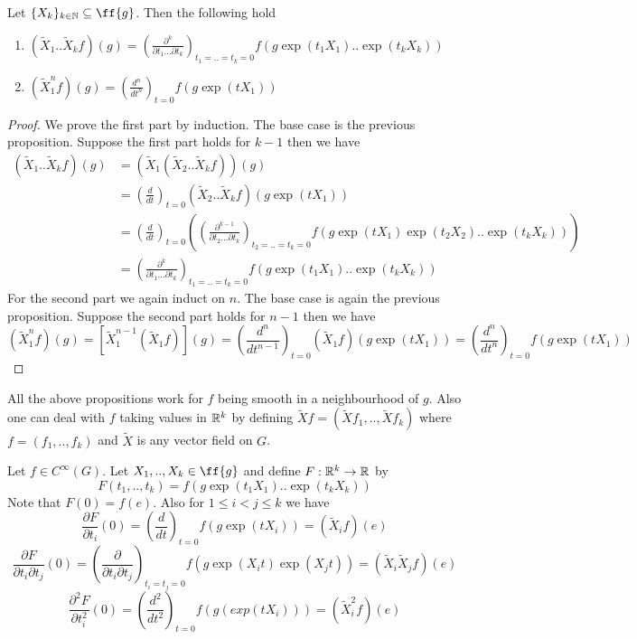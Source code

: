 \documentclass{article}
\begin{document}
\begin{proposition}
    Let $\{X_k\}_{k\in \NN}\subseteq \ff{g}$. Then the following hold
    \begin{enumerate}
        \item $(\tilde{X}_1..\tilde{X}_kf)(g) = \left(\frac{\partial^k}{\partial t_1...\partial t_k}\right)_{t_1=..=t_k=0}f(g\exp(t_1X_1)..\exp(t_kX_k))$
        \item $(\tilde{X}^n_1f)(g) = \left(\frac{d^n}{dt^n}\right)_{t=0}f(g\exp(tX_1))$
    \end{enumerate}
\end{proposition}
\begin{proof}
    We prove the first part by induction. The base case is the previous proposition. Suppose the first part holds for $k-1$ then we have 
    \begin{align*}
        (\tilde{X}_1..\tilde{X}_kf)(g) &= (\tilde{X}_1(\tilde{X}_2..\tilde{X}_kf))(g)\\
        &= \left( \frac{d}{dt} \right)_{t=0}(\tilde{X}_2..\tilde{X}_kf)(g\exp(tX_1))\\
        &= \left( \frac{d}{dt} \right)_{t=0}\left( \left( \frac{\partial^{k-1}}{\partial t_2...\partial t_k} \right)_{t_2=..=t_k=0}f(g\exp(tX_1)\exp(t_2X_2)..\exp(t_kX_k)) \right)\\
        &= \left( \frac{\partial^k}{\partial t_1...\partial t_k} \right)_{t_1=..=t_k=0}f(g\exp(t_1X_1)..\exp(t_kX_k))
    \end{align*}
    For the second part we again induct on $n$. The base case is again the previous proposition. Suppose the second part holds for $n-1$ then we have
    $$(\tilde{X}^n_1f)(g) = [\tilde{X}_1^{n-1}(\tilde{X}_1f)](g) = \left(\frac{d^n}{dt^{n-1}}\right)_{t=0}(\tilde{X}_1f)(g\exp(tX_1)) = \left(\frac{d^n}{dt^n}\right)_{t=0}f(g\exp(tX_1))$$
\end{proof}

\begin{remark*}
    All the above propositions work for $f$ being smooth in a neighbourhood of $g$. Also one can deal with $f$ taking values in $\mathbb R^k$ by defining $\tilde{X}f = (\tilde{X}f_1,..,\tilde{X}f_k)$ where $f = (f_1,..,f_k)$ and $\tilde{X}$ is any vector field on $G$.
\end{remark*}

Let $f\in C^{\infty}(G)$. Let $X_1,..,X_k\in \ff{g}$ and define $F:\mathbb R^k\to \mathbb R$ by $$F(t_1,..,t_k) = f(g\exp(t_1X_1)..\exp(t_kX_k))$$
Note that $F(0)=f(e)$. Also for $1\leq i<j\leq k$ we have$$\frac{\partial F}{\partial t_i}(0) = \left(\frac{d}{dt}\right)_{t=0} f(g\exp(t X_i)) = (\tilde{X}_if)(e)$$
$$\frac{\partial F}{\partial t_i\partial t_j}(0) = \left( \frac{\partial }{\partial t_i\partial t_j} \right)_{t_i=t_j=0}f(g\exp(X_it)\exp(X_jt)) = (\tilde{X}_i\tilde{X}_jf)(e)$$
$$\frac{\partial^2F}{\partial t_i^2}(0) = \left( \frac{d^2}{dt^2} \right)_{t=0}f(g(exp(tX_i))) = (\tilde{X}_i^2f)(e)$$
\end{document}

